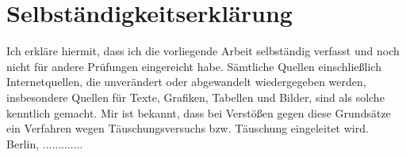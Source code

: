 \section*{Selbst\"andigkeitserkl\"arung}


Ich erkl\"are hiermit, dass ich die vorliegende Arbeit selbst\"andig verfasst und 
noch nicht f\"ur andere Pr\"ufungen eingereicht habe. S\"amtliche Quellen 
einschlie\ss lich Internetquellen, die unver\"andert oder abgewandelt wiedergegeben 
werden, insbesondere Quellen f\"ur Texte, Grafiken, Tabellen und Bilder, sind als 
solche kenntlich gemacht. Mir ist bekannt, dass bei Verst\"o\ss en gegen diese 
Grunds\"atze ein Verfahren wegen T\"auschungsversuchs bzw. T\"auschung eingeleitet 
wird.\\[3cm]
Berlin, .............